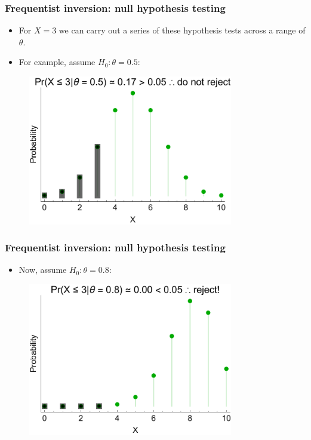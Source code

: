 \documentclass[handout]{beamer}
\begin{document}
\begin{frame}
	\frametitle{Frequentist inversion: null hypothesis testing}
	
	\begin{itemize}
		\item<2-> For $X=3$ we can carry out a series of these hypothesis tests across a range of $\theta$.
		\item<3-> For example, assume $H_0: \theta=0.5$:
	\end{itemize}
	
	\begin{figure}[ht]
		\centerline{\includegraphics[width=0.8\textwidth]{figures/binomial_h0_accept.pdf}}
	\end{figure}
	
\end{frame}

\begin{frame}
	\frametitle{Frequentist inversion: null hypothesis testing}
	
	\begin{itemize}
		\item<3-> Now, assume $H_0: \theta=0.8$:
	\end{itemize}
	
	\begin{figure}[ht]
		\centerline{\includegraphics[width=0.8\textwidth]{figures/binomial_h0_reject.pdf}}
	\end{figure}
	
\end{frame}
\end{document}
